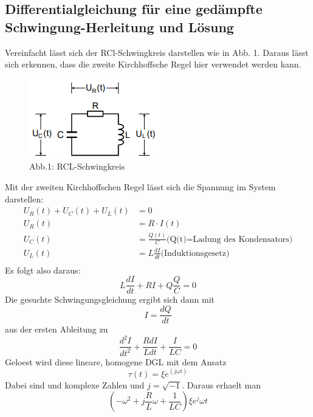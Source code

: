 \documentclass[titlepage=firstcover, captions=tableheading]{scrartcl}
\begin{document}
\subsection{Differentialgleichung für eine gedämpfte Schwingung-Herleitung und Lösung}
Vereinfacht lässt sich der RCl-Schwingkreis darstellen wie in Abb. 1. Daraus lässt sich erkennen, dass die zweite Kirchhoffsche Regel hier verwendet werden kann.
\begin{figure}[h]
    \centering
    \includegraphics{"Schaltkreis_RCL.png"}
    \caption{Abb.1: RCL-Schwingkreis}
\end{figure}
Mit der zweiten Kirchhoffschen Regel lässt sich die Spannung im System darstellen:
\begin{align}
    U_R(t)+U_C(t)+U_L(t)&=0\nonumber\\
    U_R(t)&=R\cdot I(t)\nonumber\\
    U_C(t)&=\frac{Q(t)}{C} \text{(Q(t)=Ladung des Kondensators)}\nonumber\\
    U_L(t)&=L\frac{dI}{dt} \text{(Induktionsgesetz)}\nonumber\\\nonumber
\end{align}
Es folgt also daraus:
\begin{equation}
  L\frac{dI}{dt}+RI+Q\frac{Q}{C}=0  \nonumber
\end{equation}
Die gesuchte Schwingungsgleichung ergibt sich dann mit 
\begin{equation}
    I=\frac{dQ}{dt}\nonumber
\end{equation}
aus der ersten Ableitung zu 
\begin{equation} \label{DGL}
    \frac{d^2I}{dt^2}+\frac{RdI}{Ldt}+\frac{I}{LC}=0
\end{equation}
Geloest wird diese lineare, homogene DGL mit dem Ansatz 
\begin{equation}
    \tau(t)=\xi e^(j\omega t)\nonumber
\end{equation}
Dabei sind \xi und \omega komplexe Zahlen und $j=\sqrt{-1}$.
Daraus erhaelt man 
\begin{equation}
    (-\omega^2+j\frac{R}{L}\omega+\frac{1}{LC})\xi e^j\omega t \nonumber
\end{equation}
\end{document}

